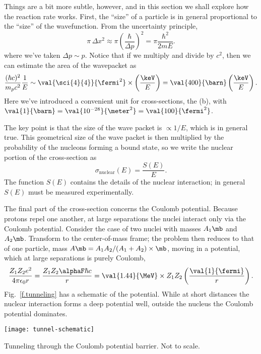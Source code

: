  Things are a bit more subtle, however, and in this section we shall explore how the reaction rate works. First, the ``size'' of a particle is in general proportional to the ``size'' of the wavefunction. From the uncertainty principle, 
\[\pi\,\Delta x^{2} \approx \pi \left(\frac{\hbar}{\Delta p}\right)^{2} = \pi\frac{\hbar^{2}}{2mE}.\]
where we've taken $\Delta p\sim p$.
Notice that if we multiply and divide by $c^{2}$, then we can estimate the area of the wavepacket as
\[
	\frac{(\hbar c)^{2}}{m_{p} c^{2}} \frac{1}{E} \sim \val{\sci{4}{4}}{\fermi^{2}} \times \left(\frac{\keV}{E}\right) = \val{400}{\barn}\left(\frac{\keV}{E}\right).
\]	
Here we've introduced a convenient unit for cross-sections, the  (b), with $\val{1}{\barn} = \val{10^{-28}}{\meter^{2}} = \val{100}{\fermi^{2}}$.

The key point is that the size of the wave packet is $\propto 1/E$, which is in general true. This geometrical size of the wave packet is then multiplied by the probability of the nucleons forming a bound state, so we write the nuclear portion of the cross-section as
\[
	\sigma_{\mathrm{nuclear}}(E) = \frac{S(E)}{E}.
\]
The function $S(E)$ contains the details of the nuclear interaction; in general $S(E)$ must be measured experimentally.

The final part of the cross-section concerns the Coulomb potential.
Because protons repel one another, at large separations the nuclei interact only via the Coulomb potential. Consider the case of two nuclei with masses $A_{1}\mb$ and $A_{2}\mb$. Transform to the center-of-mass frame; the problem then reduces to that of one particle, mass $A\mb = A_{1}A_{2}/(A_{1}+A_{2})\times\mb$, moving in a potential, which at large separations is purely Coulomb,
\[ \frac{Z_{1}Z_{2}e^{2}}{4\pi\epsilon_{0}r} = \frac{Z_{1}Z_{2}\alphaF\hbar c}{r} = \val{1.44}{\MeV}\times Z_{1}Z_{2}\left(\frac{\val{1}{\fermi}}{r}\right). \]
Fig.~\ref{f.tunneling} has a schematic of the potential. While at short distances the nuclear interaction forms a deep potential well, outside the nucleus the Coulomb potential dominates.
\begin{marginfigure}
\texttt{[image: tunnel-schematic]}
\caption[Tunneling through the Coulomb potential barrier]{Tunneling through the Coulomb potential barrier. Not to scale.}
\label{f.tunneling}
\end{marginfigure}

